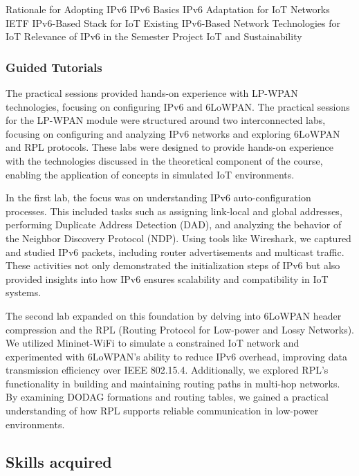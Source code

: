 Rationale for Adopting IPv6
IPv6 Basics
IPv6 Adaptation for IoT Networks
IETF IPv6-Based Stack for IoT
Existing IPv6-Based Network Technologies for IoT
Relevance of IPv6 in the Semester Project
IoT and Sustainability

\subsubsection{Guided Tutorials}
\indent \indent The practical sessions provided hands-on experience with LP-WPAN technologies, focusing on configuring IPv6 and 6LoWPAN.
The practical sessions for the LP-WPAN module were structured around two interconnected labs, focusing on configuring and analyzing IPv6 networks and exploring 6LoWPAN and RPL protocols. These labs were designed to provide hands-on experience with the technologies discussed in the theoretical component of the course, enabling the application of concepts in simulated IoT environments.

\vspace{0.25cm}
In the first lab, the focus was on understanding IPv6 auto-configuration processes. This included tasks such as assigning link-local and global addresses, performing Duplicate Address Detection (DAD), and analyzing the behavior of the Neighbor Discovery Protocol (NDP). Using tools like Wireshark, we captured and studied IPv6 packets, including router advertisements and multicast traffic. These activities not only demonstrated the initialization steps of IPv6 but also provided insights into how IPv6 ensures scalability and compatibility in IoT systems.

\vspace{0.25cm}
The second lab expanded on this foundation by delving into 6LoWPAN header compression and the RPL (Routing Protocol for Low-power and Lossy Networks).
We utilized Mininet-WiFi to simulate a constrained IoT network and experimented with 6LoWPAN's ability to reduce IPv6 overhead, improving data transmission efficiency over IEEE 802.15.4.
Additionally, we explored RPL's functionality in building and maintaining routing paths in multi-hop networks.
By examining DODAG formations and routing tables, we gained a practical understanding of how RPL supports reliable communication in low-power environments.


\subsection{Skills acquired}

